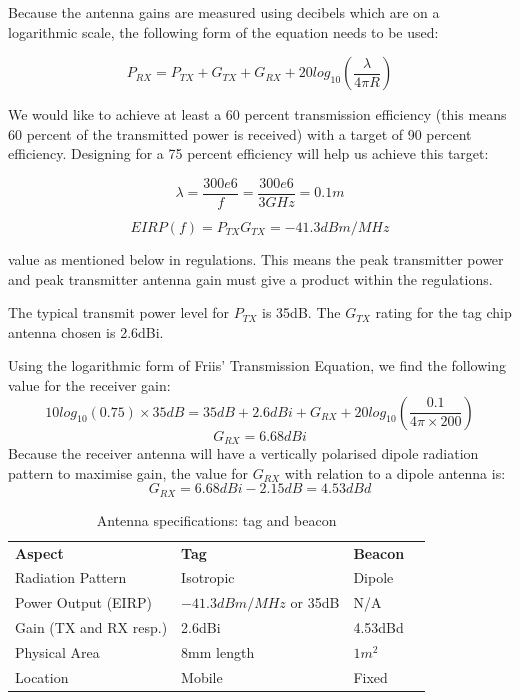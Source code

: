 Because the antenna gains are measured using decibels which are on a logarithmic scale, the following form of the equation needs to be used:

$$P_{RX} = P_{TX} + G_{TX} + G_{RX} + 20log_{10}(\frac{\lambda}{4 \pi R})$$


We would like to achieve at least a 60 percent transmission efficiency (this means 60 percent of the transmitted power is received) with a target of 90 percent efficiency. Designing for a 75 percent efficiency will help us achieve this target: 

$$\lambda = \frac{300e6}{f} = \frac{300e6}{3GHz} = 0.1m$$

$$EIRP(f) = P_{TX}G_{TX} = -41.3dBm/MHz$$
\begin{center}
value as mentioned below in regulations. This means the peak transmitter power and peak transmitter antenna gain must give a product within the regulations.
\end{center}

The typical transmit power level for $P_{TX}$ is 35dB.\cite{DW-data} The $G_{TX}$ rating for the tag chip antenna chosen is 2.6dBi.

Using the logarithmic form of Friis' Transmission Equation, we find the following value for the receiver gain: 
$$10log_{10}(0.75) \times 35dB = 35dB + 2.6dBi + G_{RX} + 20log_{10}(\frac{0.1}{4 \pi \times 200})$$
$$G_{RX} = 6.68dBi$$
Because the receiver antenna will have a vertically polarised dipole radiation pattern to maximise  gain, the value for $G_{RX}$ with relation to a dipole antenna is:\cite{Book-Antenna} 
$$G_{RX} = 6.68dBi - 2.15dB = 4.53dBd$$

\begin{table}[H]
\centering
\caption{Antenna specifications: tag and beacon}
\label{antenna-specs}
\begin{tabular}{l l l l}
\textbf{Aspect}                      & \textbf{Tag} & \textbf{Beacon} \\ 
Radiation Pattern    	& Isotropic             & Dipole              \\
Power Output (EIRP)		& $-41.3dBm/MHz$ or 35dB        & N/A \\
Gain (TX and RX resp.)                	& 2.6dBi                     & 4.53dBd                    \\
Physical Area 			& 8mm length					 & $1m^2$          \\         
Location 				& Mobile                & Fixed                    \\         
\end{tabular}
\end{table}

